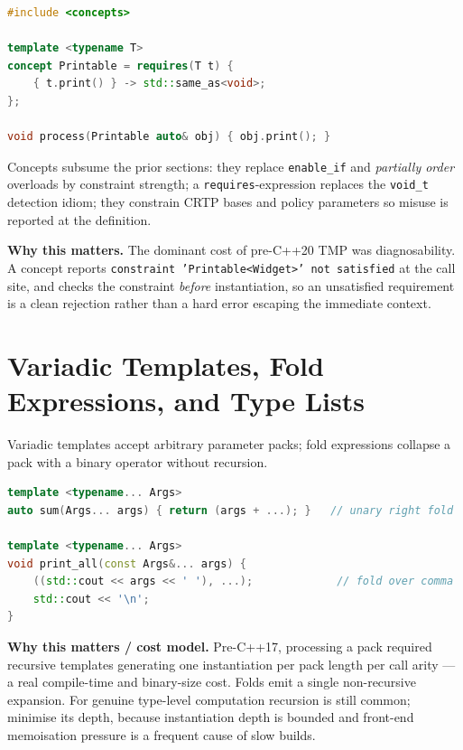 \begin{lstlisting}[language=C++, caption={A constraint that replaces both SFINAE and a detection trait. Min standard: C++20.}]
#include <concepts>

template <typename T>
concept Printable = requires(T t) {
    { t.print() } -> std::same_as<void>;
};

void process(Printable auto& obj) { obj.print(); }
\end{lstlisting}

Concepts subsume the prior sections: they replace \texttt{enable\_if} and \emph{partially order} overloads by constraint strength; a \texttt{requires}-expression replaces the \texttt{void\_t} detection idiom; they constrain CRTP bases and policy parameters so misuse is reported at the definition.

\textbf{Why this matters.} The dominant cost of pre-C++20 TMP was diagnosability. A concept reports \texttt{constraint 'Printable<Widget>' not satisfied} at the call site, and checks the constraint \emph{before} instantiation, so an unsatisfied requirement is a clean rejection rather than a hard error escaping the immediate context.

\section{Variadic Templates, Fold Expressions, and Type Lists}

Variadic templates accept arbitrary parameter packs; fold expressions collapse a pack with a binary operator without recursion.

\begin{lstlisting}[language=C++, caption={Fold expressions replace recursive pack expansion. Min standard: C++17.}]
template <typename... Args>
auto sum(Args... args) { return (args + ...); }   // unary right fold

template <typename... Args>
void print_all(const Args&... args) {
    ((std::cout << args << ' '), ...);             // fold over comma
    std::cout << '\n';
}
\end{lstlisting}

\textbf{Why this matters / cost model.} Pre-C++17, processing a pack required recursive templates generating one instantiation per pack length per call arity --- a real compile-time and binary-size cost. Folds emit a single non-recursive expansion. For genuine type-level computation recursion is still common; minimise its depth, because instantiation depth is bounded and front-end memoisation pressure is a frequent cause of slow builds.

